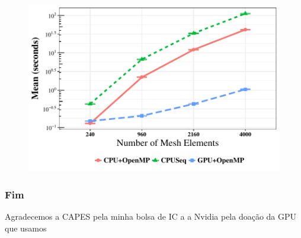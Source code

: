 \documentclass{beamer}
\begin{document}
\begin{frame}

\begin{figure}[ht]
\centering
\includegraphics[scale=0.7]{results1.pdf}
\label{fig:graphic1}
\end{figure}

\end{frame}

\begin{frame}
\frametitle{Fim}
\scriptsize

Agradecemos a CAPES pela minha bolsa de IC a a Nvidia pela doação da GPU que usamos
\normalsize
\end{frame}
\end{document}
